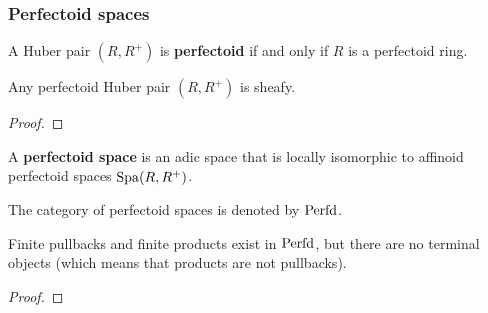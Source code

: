             \subsubsection{Perfectoid spaces}
                \begin{definition} \label{def: perfectoid_huber_pairs}
                    A Huber pair $(R, R^+)$ is \textbf{perfectoid} if and only if $R$ is a perfectoid ring. 
                \end{definition}
                
                \begin{lemma} \label{lemma: perfectoid_huber_pairs_are_sheafy}
                    Any perfectoid Huber pair $(R, R^+)$ is sheafy.
                \end{lemma}
                    \begin{proof}
                        
                    \end{proof}
                \begin{definition} \label{def: perfectoid_spaces}
                    A \textbf{perfectoid space} is an adic space that is locally isomorphic to affinoid perfectoid spaces $\mathrm{Spa}(R, R^+)$. 
                    
                    The category of perfectoid spaces is denoted by $\mathrm{Perfd}$.
                \end{definition}
                \begin{proposition} \label{prop: pullbacks_products_of_perfectoid_spaces}
                    Finite pullbacks and finite products exist in $\mathrm{Perfd}$, but there are no terminal objects (which means that products are not pullbacks). 
                \end{proposition}
                    \begin{proof}
                        
                    \end{proof}
                
